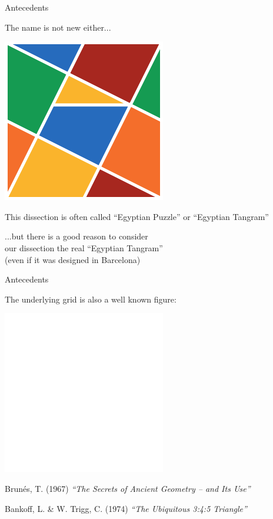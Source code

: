 \documentclass[14pt]{beamer}
\begin{document}

    \begin{frame}{Antecedents}
        \begin{center}
            The name is not new either...

            \bigskip \bigskip

            \includegraphics[height=15ex]{figures/figure000e.pdf}

            \medskip

            {\footnotesize This dissection is often called ``Egyptian Puzzle'' or ``Egyptian Tangram''}

            \bigskip \bigskip

            ...but there is a good reason to consider\\ our dissection the real ``Egyptian Tangram''\\{\footnotesize (even if it was designed in Barcelona)}
        \end{center}
    \end{frame}


    \begin{frame}{Antecedents}
        \begin{center}
            The underlying grid is also a well known figure:

            \bigskip\bigskip\bigskip

            \includegraphics[height=15ex]{figures/figure002b.pdf}\\

            \bigskip\bigskip

            {\footnotesize Brunés, T. (1967) \emph{``The Secrets of Ancient Geometry -- and Its Use''}}

            \medskip

            {\footnotesize Bankoff, L. \& W. Trigg, C. (1974) \emph{``The Ubiquitous 3:4:5 Triangle''}}
        \end{center}
    \end{frame}
\end{document}
